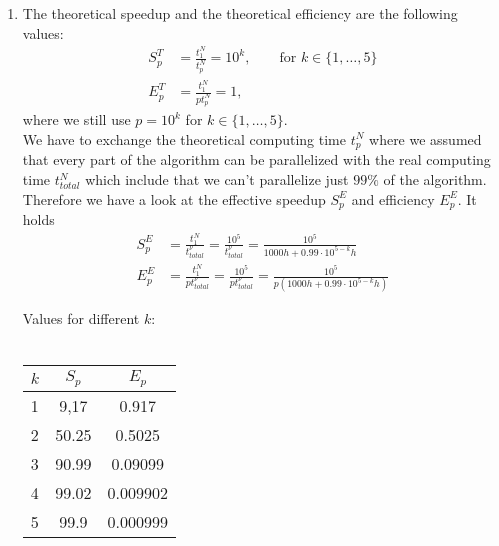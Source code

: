 \documentclass{article}
\begin{document}
\begin{enumerate}[label=(\alph*)]
  \item The theoretical speedup and the theoretical efficiency are the following values:
    \begin{align*}
      S_p^T &= \frac{t_1^N}{t_p^N} = 10^k,\qquad \text{for }k\in\{1,\dots,5\}\\
      E_p^T &= \frac{t_1^N}{pt_p^N} = 1,
    \end{align*}
    where we still use $p=10^k$ for $k\in\{1,\dots,5\}.$\\
    We have to exchange the theoretical computing time $t_p^N$ where we assumed that every part of the algorithm can be parallelized with the real computing time $t_{total}^N$ which include that we can't parallelize just $99\%$ of the algorithm.
    Therefore we have a look at the effective speedup $S_p^E$ and efficiency $E_p^E$. It holds
    \begin{align*}
      S_p^E &= \frac{t_1^N}{t_{total}^\nu}= \frac{10^5}{t_{total}^\nu} = \frac{10^5}{1000h + 0.99 \cdot 10^{5-k}h}\\
      E_p^E &= \frac{t_1^N}{pt_{total}^\nu} = \frac{10^5}{pt_{total}^\nu} = \frac{10^5}{p(1000h + 0.99 \cdot 10^{5-k}h)}
    \end{align*}
    \begin{center}
      Values for different $k$:\\~\\
      \begin{tabular}{ l | c | c } 
        $k$ & $S_p$ & $E_p$\\
        \hline
        1 &  9,17 & 0.917 \\
        2 &  50.25 & 0.5025 \\
        3 &  90.99 & 0.09099 \\
        4 &  99.02 & 0.009902 \\
        5 &  99.9 & 0.000999 \\
      \end{tabular}        
    \end{center}


\end{enumerate}
\end{document}
